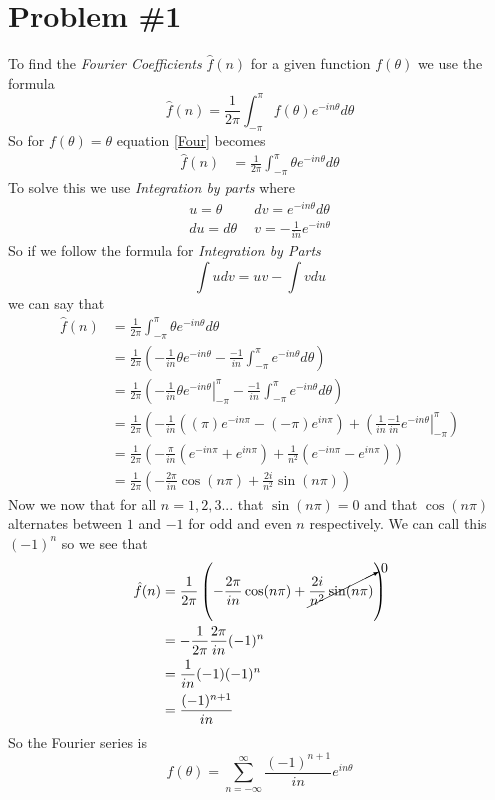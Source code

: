 \documentclass[11pt]{article}
\numberwithin{equation}{section}
\begin{document}


\section{Problem \#1}
To find the \emph{Fourier Coefficients} $\hat{f}(n)$ for a given function $f(\theta)$ we use the formula
\begin{equation}
\hat{f}(n) = \frac{1}{2\pi}\int_{-\pi}^{\pi}f(\theta)e^{-in\theta}d\theta
\label{Four}
\end{equation}
So for $f(\theta) = \theta$ equation \ref{Four} becomes
\begin{align*}
\hat{f}(n) &= \frac{1}{2\pi}\int_{-\pi}^{\pi}\theta e^{-in\theta}d\theta
\end{align*}
To solve this we use \emph{Integration by parts} where
\begin{align*}
u = \theta\ \  &dv = e^{-in\theta}d\theta\\
du = d\theta\ \  &v = -\frac{1}{in}e^{-in\theta}
\end{align*}
So if we follow the formula for \emph{Integration by Parts}
\begin{equation}
\int udv = uv - \int vdu
\label{Int}
\end{equation}
we can say that
\begin{align*}
\hat{f}(n) &= \frac{1}{2\pi}\int_{-\pi}^{\pi}\theta e^{-in\theta}d\theta\\
&= \frac{1}{2\pi}\left(-\frac{1}{in}\theta e^{-in\theta} - \frac{-1}{in}\int_{-\pi}^{\pi}e^{-in\theta}d\theta\right)\\
&= \frac{1}{2\pi}\left(\left.-\frac{1}{in}\theta e^{-in\theta}\right|_{-\pi}^{\pi} - \frac{-1}{in}\int_{-\pi}^{\pi}e^{-in\theta}d\theta\right)\\
&= \frac{1}{2\pi}\left(-\frac{1}{in}\left((\pi)e^{-in\pi} - (-\pi)e^{in\pi}\right) + \left(\frac{1}{in}\frac{-1}{in}e^{-in\theta}\right|_{-\pi}^{\pi}\right)\\
&= \frac{1}{2\pi}\left(-\frac{\pi}{in}\left(e^{-in\pi} + e^{in\pi}\right) + \frac{1}{n^2}\left(e^{-in\pi} - e^{in\pi}\right)\right)\\
&= \frac{1}{2\pi}\left(-\frac{2\pi}{in}\cos(n\pi) + \frac{2i}{n^2}\sin(n\pi)\right)
\end{align*}
Now we now that for all $n=1,2,3...$ that $\sin(n\pi) = 0$ and that $\cos(n\pi)$ alternates between $1$ and $-1$ for odd and even $n$ respectively. We can call this $(-1)^n$ so we see that
\begin{align*}
\hat{f}(n) &= \frac{1}{2\pi}\left(-\frac{2\pi}{in}\cos(n\pi) + \cancelto{0}{\frac{2i}{n^2}\sin(n\pi)}\right)\\
&= -\frac{1}{2\pi}\frac{2\pi}{in}(-1)^n\\
&= \frac{1}{in}(-1)(-1)^n\\
&= \frac{(-1)^{n+1}}{in}
\end{align*}
So the Fourier series is
$$f(\theta) = \sum_{n=-\infty}^{\infty}\frac{(-1)^{n+1}}{in}e^{in\theta}$$
\end{document}
